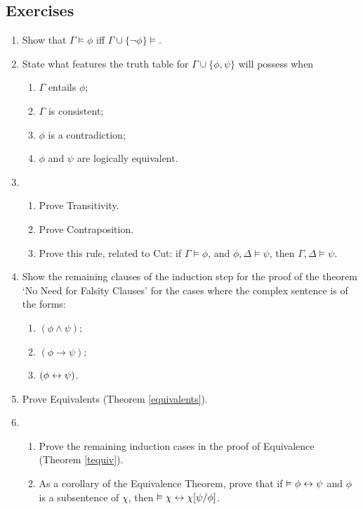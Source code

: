 {\small


\subsection*{Exercises}


\begin{enumerate}
	\item Show that $\Gamma \vDash \phi$ iff $\Gamma \cup \{\neg \phi\} \vDash$.

	\item State what features the truth table for $\Gamma \cup \{\phi,\psi\}$ will possess when \begin{enumerate}
		\item $\Gamma$ entails $\phi$;
		\item $\Gamma$ is consistent;
		\item $\phi$ is a contradiction;
		\item $\phi$ and $\psi$ are logically equivalent.
	\end{enumerate}
	
\item \begin{enumerate}
	\item Prove Transitivity.
	\item Prove Contraposition.
	\item Prove this rule, related to Cut: if $\Gamma \vDash \phi$, and $\phi,\Delta \vDash \psi$, then $\Gamma,\Delta \vDash \psi$.
\end{enumerate} 

\item Show the remaining clauses of the induction step for the proof of the theorem `No Need for Falsity Clauses' for the cases where the complex sentence is of the forms: \begin{enumerate}
	\item $(\phi \wedge \psi)$;
	\item $(\phi \to \psi)$;
	\item $(\phi \leftrightarrow \psi)$.
\end{enumerate}


\item Prove Equivalents (Theorem \ref{equivalents}).

\item \begin{enumerate}
	\item Prove the remaining induction cases in the proof of Equivalence (Theorem \ref{tequiv}).
	\item As a corollary of the Equivalence Theorem, prove that if $\vDash \phi\leftrightarrow\psi$ and $\phi$ is a subsentence of $\chi$, then $\vDash \chi \leftrightarrow \chi[\psi/\phi]$.
\end{enumerate}


\end{enumerate}}
